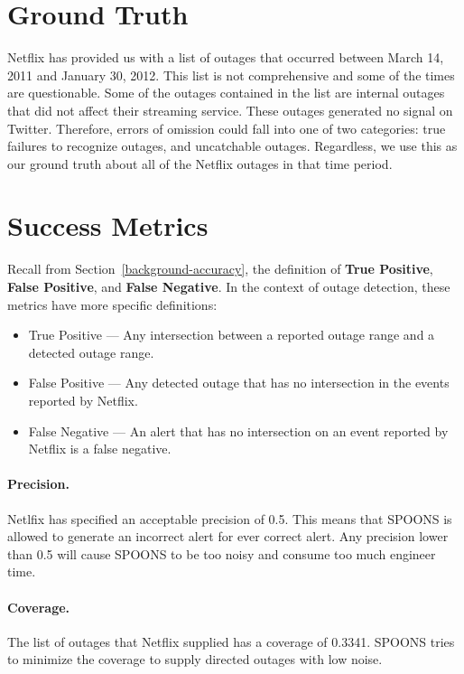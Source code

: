 \documentclass[12pt]{ucthesis}
\begin{document}
\section{Ground Truth}
\label{outage-detection-truth}
Netflix has provided us with a list of outages that occurred between March 14, 2011 and January 30, 2012.
This list is not comprehensive and some of the times are questionable. Some of the outages contained in the list
are internal outages that did not affect their streaming service. These outages generated no signal on Twitter.
Therefore, errors of omission could fall into one of two categories: true failures to recognize outages, and uncatchable
outages. Regardless, we use this as our ground truth about all of the Netflix outages in that time period.

\section{Success Metrics}
\label{outage-detection-metrics}
Recall from Section~\ref{background-accuracy}, the definition of \textbf{True Positive}, \textbf{False Positive}, and \textbf{False Negative}.
In the context of outage detection, these metrics have more specific definitions:
\begin{itemize}
   \item True Positive --- Any intersection between a reported outage range and a detected outage range.
   \item False Positive --- Any detected outage that has no intersection in the events reported by Netflix.
   \item False Negative --- An alert that has no intersection on an event reported by Netflix is a false negative.
\end{itemize}

\paragraph{Precision.}
Netlfix has specified an acceptable precision of 0.5.
This means that SPOONS is allowed to generate an incorrect alert for ever correct alert.
Any precision lower than 0.5 will cause SPOONS to be too noisy and consume too much engineer time.

\paragraph{Coverage.}
The list of outages that Netflix supplied has a coverage of 0.3341.
SPOONS tries to minimize the coverage to supply directed outages with low noise.
\end{document}
